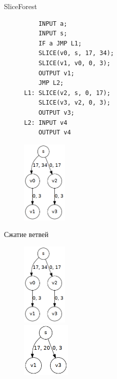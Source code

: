 \documentclass[presentation]{beamer}
\begin{document}
\begin{frame}[label={sec:orga9540cc},fragile]{SliceForest}
 \begin{figure}
\begin{minipage}[t]{0.5\textwidth}
\begin{verbatim}
    INPUT a;
    INPUT s;
    IF a JMP L1;
    SLICE(v0, s, 17, 34);
    SLICE(v1, v0, 0, 3);
    OUTPUT v1;
    JMP L2;
L1: SLICE(v2, s, 0, 17);
    SLICE(v3, v2, 0, 3);
    OUTPUT v3;
L2: INPUT v4
    OUTPUT v4
\end{verbatim}
\end{minipage}
\begin{minipage}[t]{0.2\textwidth}
\begin{center}
\includegraphics[height=150px]{slice-forest.png}
\end{center}

\end{minipage}
\end{figure}
\end{frame}
\begin{frame}[label={sec:org6eb6021}]{Сжатие ветвей}
\begin{figure}
\begin{minipage}[t]{0.4\textwidth}
\begin{center}
\includegraphics[height=150px]{slice-forest.png}
\end{center}
\end{minipage}
\begin{minipage}[t]{0.4\textwidth}
\begin{center}
\includegraphics[height=100px]{slice-forest-compressed.png}
\end{center}

\end{minipage}
\end{figure}
\end{frame}
\end{document}
